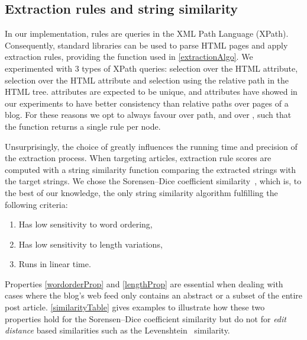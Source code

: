 \subsection{Extraction rules and string similarity}
\label{extractionrulesandstringsimilarity}

In our implementation, rules are queries in the XML Path Language 
(XPath). Consequently, standard libraries can be used to parse HTML pages 
and apply extraction rules, providing the  function used in 
\autoref{extractionAlgo}. We experimented with 3 types of XPath queries: 
selection over the HTML  attribute, selection over the HTML 
 attribute and selection using the relative path in the HTML 
tree.  attributes are expected to be unique, and  
attributes have showed in our experiments to have better consistency than 
relative paths over pages of a blog. For these reasons we opt to always 
favour  over path, and  over , such 
that the  function returns a single rule per node.

\allrulesAlgo

Unsurprisingly, the choice of  greatly influences 
the running time and precision of the extraction process. When targeting 
articles, extraction rule scores are computed with a string similarity 
function comparing the extracted strings with the target strings. 
We chose the Sorensen–Dice coefficient similarity~\cite{dice1945}, 
which is, to the best of our knowledge, the only string similarity 
algorithm fulfilling the following criteria:

\begin{enumerate}
\item\label{wordorderProp} Has low sensitivity to word ordering,
\item\label{lengthProp} Has low sensitivity to length variations,
\item\label{linearProp} Runs in linear time.
\end{enumerate}

Properties \ref{wordorderProp} and \ref{lengthProp} are essential when 
dealing with cases where the blog's web feed only contains an abstract 
or a subset of the entire post article. \autoref{similarityTable} 
gives examples to illustrate how these two properties hold for the 
Sorensen–Dice coefficient similarity but do not for \emph{edit distance} 
based similarities such as the Levenshtein~\cite{levenshtein1966} 
similarity.

